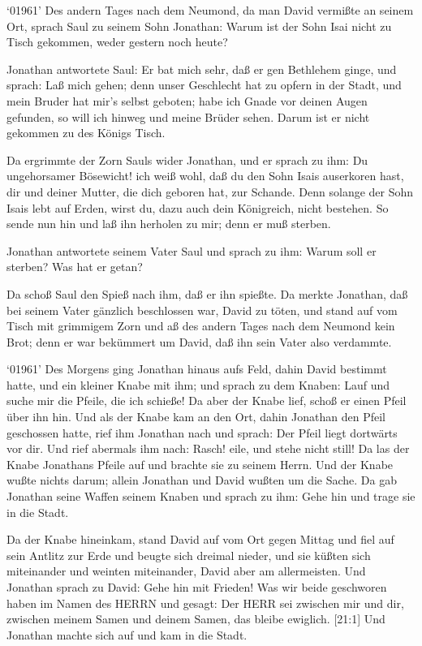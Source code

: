  `01961' Des andern Tages nach dem Neumond, da man David
vermißte an seinem Ort, sprach Saul zu seinem Sohn Jonathan: Warum ist
der Sohn Isai nicht zu Tisch gekommen, weder gestern noch heute?

 Jonathan antwortete Saul: Er bat mich sehr, daß er gen
Bethlehem ginge,  und sprach: Laß mich gehen; denn unser
Geschlecht hat zu opfern in der Stadt, und mein Bruder hat mir's selbst
geboten; habe ich Gnade vor deinen Augen gefunden, so will ich hinweg
und meine Brüder sehen. Darum ist er nicht gekommen zu des Königs Tisch.

 Da ergrimmte der Zorn Sauls wider Jonathan, und er sprach
zu ihm: Du ungehorsamer Bösewicht! ich weiß wohl, daß du den Sohn Isais
auserkoren hast, dir und deiner Mutter, die dich geboren hat, zur
Schande.  Denn solange der Sohn Isais lebt auf Erden, wirst
du, dazu auch dein Königreich, nicht bestehen. So sende nun hin und laß
ihn herholen zu mir; denn er muß sterben.

 Jonathan antwortete seinem Vater Saul und sprach zu ihm:
Warum soll er sterben? Was hat er getan?

 Da schoß Saul den Spieß nach ihm, daß er ihn spießte. Da
merkte Jonathan, daß bei seinem Vater gänzlich beschlossen war, David zu
töten,  und stand auf vom Tisch mit grimmigem Zorn und aß
des andern Tages nach dem Neumond kein Brot; denn er war bekümmert um
David, daß ihn sein Vater also verdammte.

 `01961' Des Morgens ging Jonathan hinaus aufs Feld, dahin
David bestimmt hatte, und ein kleiner Knabe mit ihm;  und
sprach zu dem Knaben: Lauf und suche mir die Pfeile, die ich schieße! Da
aber der Knabe lief, schoß er einen Pfeil über ihn hin. 
Und als der Knabe kam an den Ort, dahin Jonathan den Pfeil geschossen
hatte, rief ihm Jonathan nach und sprach: Der Pfeil liegt dortwärts vor
dir.  Und rief abermals ihm nach: Rasch! eile, und stehe
nicht still! Da las der Knabe Jonathans Pfeile auf und brachte sie zu
seinem Herrn.  Und der Knabe wußte nichts darum; allein
Jonathan und David wußten um die Sache.  Da gab Jonathan
seine Waffen seinem Knaben und sprach zu ihm: Gehe hin und trage sie in
die Stadt.

 Da der Knabe hineinkam, stand David auf vom Ort gegen
Mittag und fiel auf sein Antlitz zur Erde und beugte sich dreimal
nieder, und sie küßten sich miteinander und weinten miteinander, David
aber am allermeisten.  Und Jonathan sprach zu David: Gehe
hin mit Frieden! Was wir beide geschworen haben im Namen des HERRN und
gesagt: Der HERR sei zwischen mir und dir, zwischen meinem Samen und
deinem Samen, das bleibe ewiglich. {[}21:1{]} Und Jonathan machte sich
auf und kam in die Stadt.

